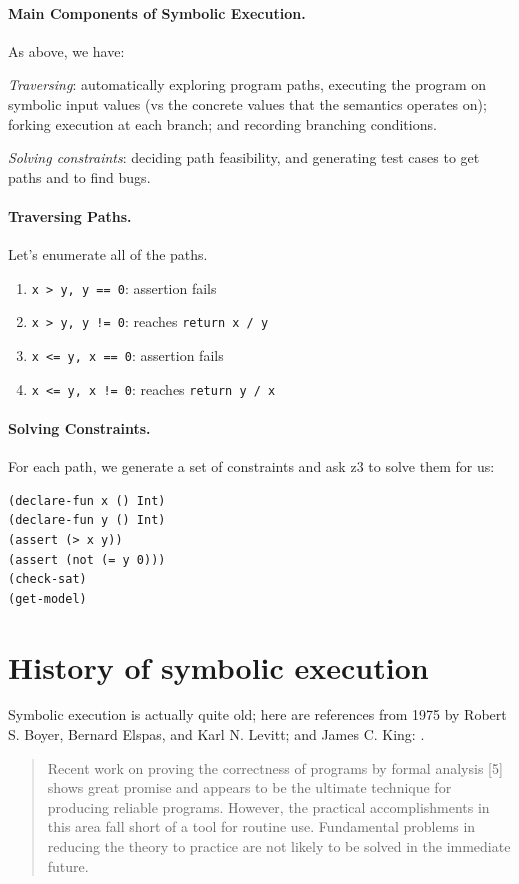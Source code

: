 \documentclass[11pt]{article}
\begin{document}
\paragraph{Main Components of Symbolic Execution.} As above, we have:

\emph{Traversing}: automatically exploring program paths, executing the program on symbolic input values (vs the concrete values that the semantics operates on); forking execution at each branch; and recording branching conditions.

\emph{Solving constraints}: deciding path feasibility, and generating test cases to get paths and to find bugs.

\paragraph{Traversing Paths.} Let's enumerate all of the paths.
\begin{enumerate}[noitemsep]
\item \texttt{x > y, y == 0}: assertion fails
\item \texttt{x > y, y != 0}: reaches \texttt{return x / y}
\item \texttt{x <= y, x == 0}: assertion fails
\item \texttt{x <= y, x != 0}: reaches \texttt{return y / x}
\end{enumerate}

\paragraph{Solving Constraints.} For each path, we generate a set of constraints and ask z3 to solve them for us:
\begin{lstlisting}
(declare-fun x () Int)
(declare-fun y () Int)
(assert (> x y))
(assert (not (= y 0)))
(check-sat)
(get-model)
\end{lstlisting}

\section*{History of symbolic execution}
Symbolic execution is actually quite old; here are references from 1975 by Robert S. Boyer, Bernard Elspas, and Karl N. Levitt; and James C. King: \cite{boyer75:_selec,king75}.

\begin{quote}
  Recent work on proving the correctness of programs by formal analysis [5] shows great promise and appears to be the ultimate technique for producing reliable programs. However,
  the practical accomplishments in this area fall short of a tool for routine use. Fundamental problems in reducing the theory to practice are not likely to be solved in the immediate future.
\end{quote}
\end{document}
